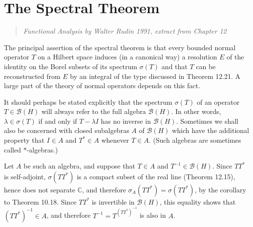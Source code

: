 











\section{The Spectral Theorem}


\begin{quotation}
  \emph{Functional Analysis by Walter Rudin 1991, extract from Chapter 12}
\end{quotation}

The principal assertion of the spectral theorem is that every bounded normal operator $T$ on a Hilbert space induces (in a canonical way) a resolution $E$ of the identity on the Borel subsets of its spectrum $\sigma(T)$ and that $T$ can be reconstructed from $E$ by an integral of the type discussed in Theorem 12.21.
A large part of the theory of normal operators depends on this fact.

It should perhaps be stated explicitly that the spectrum $\sigma(T)$ of an operator $T \in \mathcal{B}(H)$ will always refer to the full algebra $\mathcal{B}(H)$.
In other words, $\lambda \in \sigma(T)$ if and only if $T - \lambda I$ has no inverse in $\mathcal{B}(H)$.
Sometimes we shall also be concerned with closed subalgebras $A$ of $\mathcal{B}(H)$ which have the additional property that $I \in A$ and $T^* \in A$ whenever $T \in A$. (Such algebras are sometimes called $*$-algebras.)

Let $A$ be such an algebra, and suppose that $T \in A$ and $T^{-1} \in \mathcal{B}(H)$.
Since $TT^*$ is self-adjoint, $\sigma(TT^*)$ is a compact subset of the real line (Theorem 12.15), hence does not separate $\mathbb{C}$, and therefore $\sigma_A(TT^*) = \sigma(TT^*)$, by the corollary to Theorem 10.18.
Since $TT^*$ is invertible in $\mathcal{B}(H)$, this equality shows that $(TT^*)^{-1} \in A$, and therefore $T^{-1} = T^(TT^*)^{-1}$ is also in $A$.

